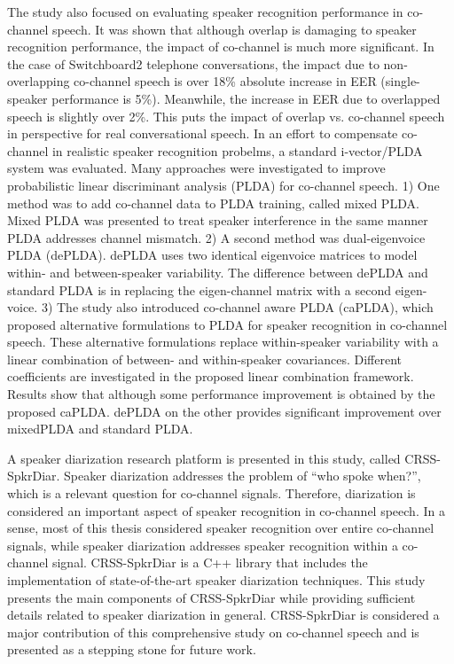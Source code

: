 The study also focused on evaluating speaker recognition performance in co-channel speech. 
It was shown that although overlap is damaging to speaker recognition performance, the impact of co-channel is much more significant. 
In the case of Switchboard2 telephone conversations, the impact due to non-overlapping co-channel speech is over 18\% absolute increase in EER (single-speaker performance is 5\%). 
Meanwhile, the increase in EER due to overlapped speech is slightly over 2\%. 
This puts the impact of overlap vs. co-channel speech in perspective for real conversational speech. 
In an effort to compensate co-channel in realistic speaker recognition probelms, a standard i-vector/PLDA system was evaluated. 
Many approaches were investigated to improve probabilistic linear discriminant analysis (PLDA) for co-channel speech. 
1) One method was to add co-channel data to PLDA training, called mixed PLDA. 
Mixed PLDA was presented to treat speaker interference in the same manner PLDA addresses channel mismatch.
2) A second method was dual-eigenvoice PLDA (dePLDA). dePLDA uses two identical eigenvoice matrices to model within- and between-speaker variability. The difference between dePLDA and standard PLDA is in replacing the eigen-channel matrix with a second eigen-voice. 
3) The study also introduced co-channel aware PLDA (caPLDA), which proposed alternative formulations to PLDA for speaker recognition in co-channel speech. 
These alternative formulations replace within-speaker variability with a linear combination of between- and within-speaker covariances. 
Different coefficients are investigated in the proposed linear combination framework. 
Results show that although some performance improvement is obtained by the proposed caPLDA. 
dePLDA on the other provides significant improvement over mixedPLDA and standard PLDA.  

A speaker diarization research platform is presented in this study, called CRSS-SpkrDiar. 
Speaker diarization addresses the problem of ``who spoke when?'', which is a relevant question for co-channel signals. 
Therefore, diarization is considered an important aspect of speaker recognition in co-channel speech. 
In a sense, most of this thesis considered speaker recognition over entire co-channel signals, while speaker diarization addresses speaker recognition within a co-channel signal. 
CRSS-SpkrDiar is a C++ library that includes the implementation of state-of-the-art speaker diarization techniques. 
This study presents the main components of CRSS-SpkrDiar while providing sufficient details related to speaker diarization in general. 
CRSS-SpkrDiar is considered a major contribution of this comprehensive study on co-channel speech and is presented as a stepping stone for future work. 




